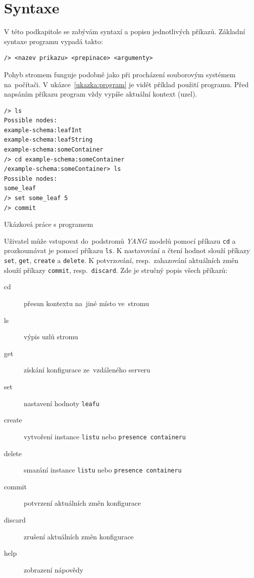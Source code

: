 \documentclass[thesis=B,czech,hidelinks]{FITthesis}[2019/03/06]
\begin{document}
\section{Syntaxe}\label{syntaxe}
V této podkapitole se zabývám syntaxí a popisu jednotlivých příkazů. Základní syntaxe programu vypadá takto:
\begin{verbatim}
/> <nazev prikazu> <prepinace> <argumenty>
\end{verbatim}
Pohyb stromem funguje podobně jako při procházení souborovým systémem na~počítači. V ukázce~\ref{ukazka:program} je vidět příklad použití programu. Před napsáním příkazu program vždy vypíše aktuální kontext (uzel).

\begin{listing}[H]
\begin{verbatim}
/> ls
Possible nodes:
example-schema:leafInt
example-schema:leafString
example-schema:someContainer
/> cd example-schema:someContainer
/example-schema:someContainer> ls
Possible nodes:
some_leaf
/> set some_leaf 5
/> commit
\end{verbatim}
\caption{Ukázková práce s programem}\label{ukazka:program}
\end{listing}

Uživatel může vstupovat do~podstromů \textit{YANG} modelů pomocí příkazu \texttt{cd} a prozkoumávat je pomocí příkazu \texttt{ls}. K nastavování a čtení hodnot slouží příkazy \texttt{set}, \texttt{get}, \texttt{create} a \texttt{delete}. K potvrzování, resp.\ zahazování aktuálních změn slouží příkazy \texttt{commit}, resp.\ \texttt{discard}. Zde je stručný popis všech příkazů:
\begin{description}
\item[cd]{přesun kontextu na~jiné místo ve~stromu}
\item[ls]{výpis uzlů stromu}
\item[get]{získání konfigurace ze~vzdáleného serveru}
\item[set]{nastavení hodnoty \texttt{leafu}}
\item[create]{vytvoření instance \texttt{listu} nebo \texttt{presence containeru}}
\item[delete]{smazání instance \texttt{listu} nebo \texttt{presence containeru}}
\item[commit]{potvrzení aktuálních změn konfigurace}
\item[discard]{zrušení aktuálních změn konfigurace}
\item[help]{zobrazení nápovědy}
\end{description}
\end{document}
